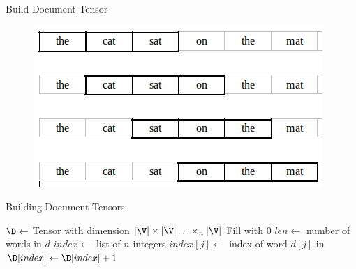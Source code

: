 \documentclass[handout]{beamer}
\begin{document}
\begin{frame}{Build Document Tensor}
  \begin{figure}
    \centering
    \includegraphics[height=0.5\textheight]{diagrams/sliding-window}
  \end{figure}
\end{frame}

\begin{frame}{Building Document Tensors}
  \small
\begin{algorithm}[H]
  \caption{Build Tensor}
  \label{alg:BuildTensor}
    
  
  \Output{\D}
  \BlankLine
  $\D \leftarrow $ Tensor with dimension $|\V| \times |\V| \ldots
  \times_n |\V|$\;
  Fill \D with 0\;
  $len \leftarrow$ number of words in $d$\;
   {
    $index \leftarrow$ list of $n$ integers\;
     {
      $index[j] \leftarrow$ index of word $d[j]$ in \V\;
    }
    $\D[index] \leftarrow \D[index] + 1$\;
  }
  \Return{\D}
\end{algorithm}
\end{frame}
\end{document}
